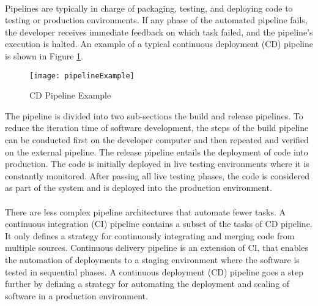 \paragraph{}

Pipelines are typically in charge of packaging, testing, and deploying code to testing or production environments.
If any phase of the automated pipeline fails, the developer receives immediate feedback on which task failed, and the pipeline's execution is halted.
An example of a typical continuous deployment (CD) pipeline is shown in Figure \ref{fig:pipeline_example}.

\begin{figure}[htbp]
    \centering
    \texttt{[image: pipelineExample]}
    \caption{CD Pipeline Example}
    \label{fig:pipeline_example}
\end{figure}

The pipeline is divided into two sub-sections the build and release pipelines.
To reduce the iteration time of software development,
the steps of the build pipeline can be conducted first on the developer computer and then repeated and verified on the external pipeline.
The release pipeline entails the deployment of code into production.
The code is initially deployed in live testing environments where it is constantly monitored.
After passing all live testing phases, the code is considered as part of the system and is deployed into the production environment.

\paragraph{}

There are less complex pipeline architectures that automate fewer tasks.
A continuous integration (CI) pipeline contains a subset of the tasks of CD pipeline.
It only defines a strategy for continuously integrating and merging code from multiple sources.
Continuous delivery pipeline is an extension of CI, that enables the automation of deployments to a staging environment where the software is tested in sequential phases.
A continuous deployment (CD) pipeline goes a step further by defining a strategy for automating the deployment and scaling of software in a production environment.




